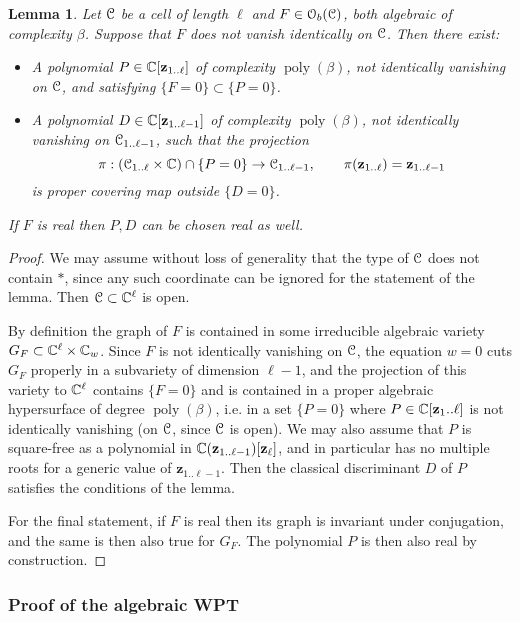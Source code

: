 \documentclass[reqno]{amsart}
\newtheorem{Lem}[Cor]{Lemma}{\bfseries}{\itshape}
\renewcommand\~[1]{\widetilde{#1}}
\def\poly{\operatorname{poly}} \def\J{\operatorname{J}}
\def\cO{{\mathcal O}}
\def\vz{{\mathbf z}}
\begin{document}
\begin{Lem}\label{lem:discriminant-alg}
  Let ${\mathcal C}$ be a cell of length $\ell$ and $F\in\cO_b(\cC)$, both
  algebraic of complexity $\beta$. Suppose that $F$ does not vanish
  identically on ${\mathcal C}$. Then there exist:
  \begin{itemize}
  \item A polynomial $P\in\C[\vz_{1..\ell}]$ of complexity $\poly(\beta)$, not
    identically vanishing on ${\mathcal C}$, and satisfying
    $\{F=0\}\subset\{P=0\}$.
  \item A polynomial $D\in\C[\vz_{1..\ell-1}]$ of complexity
    $\poly(\beta)$, not identically vanishing on ${\mathcal C}_{1..\ell-1}$,
    such that the projection 
    \begin{equation}
      \pi:(\cC_{1..\ell}\times\C)\cap\{P=0\}\to\cC_{1..\ell-1}, \qquad \pi(\vz_{1..\ell})=\vz_{1..\ell-1}
    \end{equation}
    is proper covering map outside $\{D=0\}$.
  \end{itemize}
  If $F$ is real then $P,D$ can be chosen real as well.
\end{Lem}
\begin{proof}
  We may assume without loss of generality that the type of ${\mathcal C}$ does
  not contain $*$, since any such coordinate can be ignored for the
  statement of the lemma. Then ${\mathcal C}\subset{\mathbb C}^\ell$ is open.

  By definition the graph of $F$ is contained in some irreducible
  algebraic variety $G_F\subset{\mathbb C}^\ell\times{\mathbb C}_w$. Since $F$ is not
  identically vanishing on ${\mathcal C}$, the equation $w=0$ cuts $G_F$
  properly in a subvariety of dimension $\ell-1$, and the projection
  of this variety to ${\mathbb C}^\ell$ contains $\{F=0\}$ and is contained in
  a proper algebraic hypersurface of degree $\poly(\beta)$, i.e. in a
  set $\{P=0\}$ where $P\in\C[\vz_1..\ell]$ is not identically
  vanishing (on ${\mathcal C}$, since ${\mathcal C}$ is open).  We may also assume that
  $P$ is square-free as a polynomial in
  $\C(\vz_{1..\ell-1})[\vz_\ell]$, and in particular has no multiple
  roots for a generic value of $\vz_{1..\ell-1}$. Then the classical
  discriminant $D$ of $P$ satisfies the conditions of the lemma.

  For the final statement, if $F$ is real then its graph is invariant
  under conjugation, and the same is then also true for $G_F$. The
  polynomial $P$ is then also real by construction.
\end{proof}

\subsubsection{Proof of the algebraic WPT}
\end{document}
